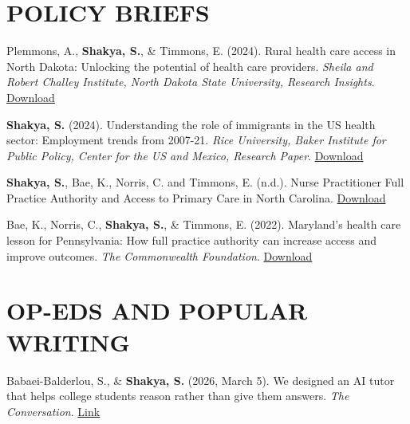 \section*{POLICY BRIEFS}
\begin{etaremune}
\item Plemmons, A., \textbf{Shakya, S.}, \& Timmons, E. (2024). Rural health care access in North Dakota: Unlocking the potential of health care providers. \textit{Sheila and Robert Challey Institute, North Dakota State University, Research Insights}. \hfill \href{https://www.ndsu.edu/fileadmin/challeyinstitute/Research_Briefs/Rural_Health_Care_Access.pdf}{Download}

\item \textbf{Shakya, S.} (2024). Understanding the role of immigrants in the US health sector: Employment trends from 2007-21. \textit{Rice University, Baker Institute for Public Policy, Center for the US and Mexico, Research Paper}. \hfill \href{https://www.bakerinstitute.org/research/understanding-role-immigrants-us-health-sector-employment-trends-2007-21}{Download}

\item \textbf{Shakya, S.}, Bae, K., Norris, C. and Timmons, E. (n.d.). Nurse Practitioner Full Practice Authority and Access to Primary Care in North Carolina. \hfill \href{https://csorwvu.com/np_full_practice_authority_nc/}{Download}

\item Bae, K., Norris, C., \textbf{Shakya, S.}, \& Timmons, E. (2022). Maryland's health care lesson for Pennsylvania: How full practice authority can increase access and improve outcomes. \textit{The Commonwealth Foundation}. \hfill \href{https://www.commonwealthfoundation.org/wp-content/uploads/2022/11/Expanding-Health-Care-Access.pdf}{Download}

\end{etaremune}

\section*{OP-EDS AND POPULAR WRITING}
\begin{etaremune}
\item Babaei-Balderlou, S., \& \textbf{Shakya, S.} (2026, March 5). We designed an AI tutor that helps college students reason rather than give them answers. \textit{The Conversation}. \hfill \href{https://theconversation.com/we-designed-an-ai-tutor-that-helps-college-students-reason-rather-than-give-them-answers-276584}{Link}
\end{etaremune}


